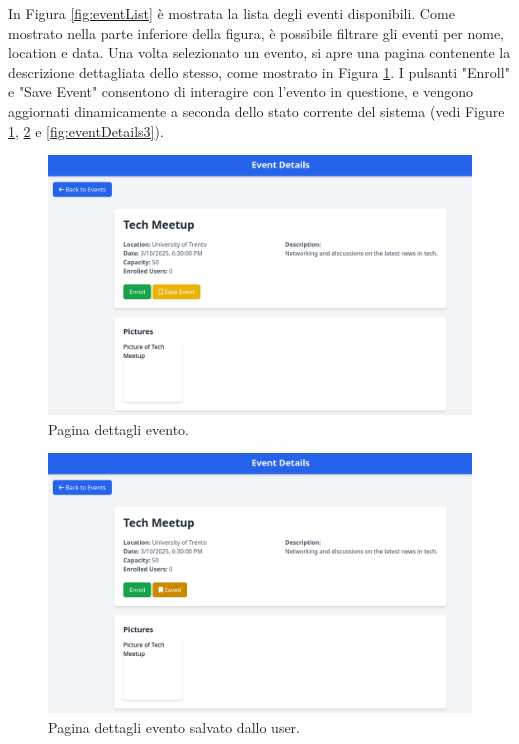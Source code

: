 \documentclass[9pt]{extarticle}
\begin{document}
In Figura \ref{fig:eventList} è mostrata la lista degli eventi disponibili. Come mostrato nella parte inferiore della figura, è possibile filtrare gli eventi per nome, location e data. Una volta selezionato un evento, si apre una pagina contenente la descrizione dettagliata dello stesso, come mostrato in Figura \ref{fig:eventDetails1}. I pulsanti "Enroll" e "Save Event" consentono di interagire con l'evento in questione, e vengono aggiornati dinamicamente a seconda dello stato corrente del sistema (vedi Figure \ref{fig:eventDetails1}, \ref{fig:eventDetails2} e \ref{fig:eventDetails3}).

\newpage

\begin{figure}[!htb]
	\centering
	\includegraphics[width=0.9\linewidth]{./images/EventDetails1.png}
	\caption{Pagina dettagli evento.}
	\label{fig:eventDetails1}
\end{figure}

\begin{figure}[!htb]
	\centering
	\includegraphics[width=0.9\linewidth]{./images/EventDetails2.png}
	\caption{Pagina dettagli evento salvato dallo user.}
	\label{fig:eventDetails2}
\end{figure}
\end{document}
